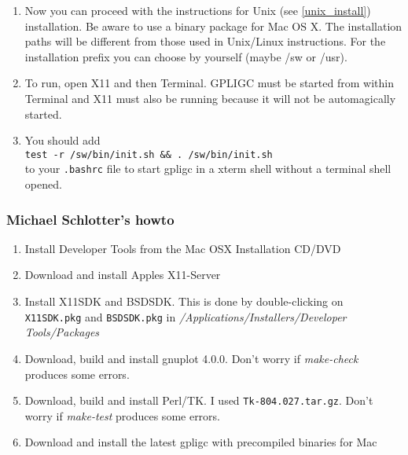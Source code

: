 \begin{enumerate}
\item Now you can proceed with the instructions for Unix (see \ref{unix_install}) installation. Be aware to use a binary package for Mac OS X.
The installation paths will be different from those used in Unix/Linux instructions.
For the installation prefix  you can choose by yourself (maybe /sw or /usr).

\item  To run, open X11 and then Terminal.  GPLIGC must be started from
within Terminal and X11 must also be running because it will not be
automagically started.

\item You should add \\
\texttt{test -r /sw/bin/init.sh \&\& . /sw/bin/init.sh} \\
to your \texttt{.bashrc} file to start gpligc in a xterm shell
without a terminal shell opened.

\end{enumerate}


\subsubsection{Michael Schlotter's howto}
\label{schlotter}

\begin{enumerate}
\item  Install Developer Tools from the Mac OSX Installation CD/DVD
\item  Download and install Apples X11-Server
\item  Install X11SDK and BSDSDK. This is done by double-clicking on
    \texttt{X11SDK.pkg} and \texttt{BSDSDK.pkg} in
    \textit{/Applications/Installers/Developer Tools/Packages}
\item Download, build and install gnuplot 4.0.0.
    Don't worry if \textit{make-check} produces some errors.
\item Download, build and install Perl/TK. I used \texttt{Tk-804.027.tar.gz}.
    Don't worry if \textit{make-test} produces some errors.
\item Download and install the latest gpligc with precompiled binaries for Mac
\end{enumerate}
